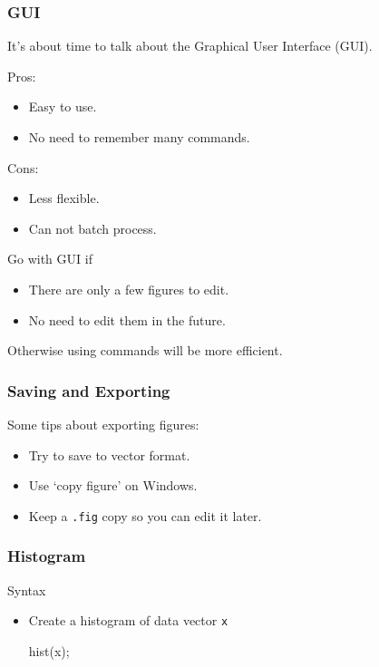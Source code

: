 \documentclass{beamer}  %
\begin{document}
\begin{frame}[fragile]
\frametitle{GUI}
It's about time to talk about the Graphical User Interface (GUI).

Pros:
\begin{itemize}
    \item Easy to use.
    \item No need to remember many commands.
\end{itemize}
\pause
Cons:
\begin{itemize}
    \item Less flexible.
    \item Can not batch process.
\end{itemize}
\pause
\begin{block}{Go with GUI if}
\begin{itemize}
    \item There are only a few figures to edit.
    \item No need to edit them in the future.
\end{itemize}

Otherwise using commands will be more efficient.
\end{block}
\end{frame}
\begin{frame}[fragile]
\frametitle{Saving and Exporting}
Some tips about exporting figures:
\begin{itemize}[<+->]
    \item Try to save to vector format.
    \item Use `copy figure' on Windows.
    \item Keep a \texttt{.fig} copy so you can edit it later.
\end{itemize}

\end{frame}
\begin{frame}[fragile]
\frametitle{Histogram}

\begin{block}{Syntax}
\begin{itemize}[<+->]
    \item Create a histogram of data vector \texttt{x}
          \begin{matlabcodebeamer}[numbers=none,frame=none]
          hist(x);
          \end{matlabcodebeamer}
\end{itemize}
\end{block}

\end{frame}
\end{document}
